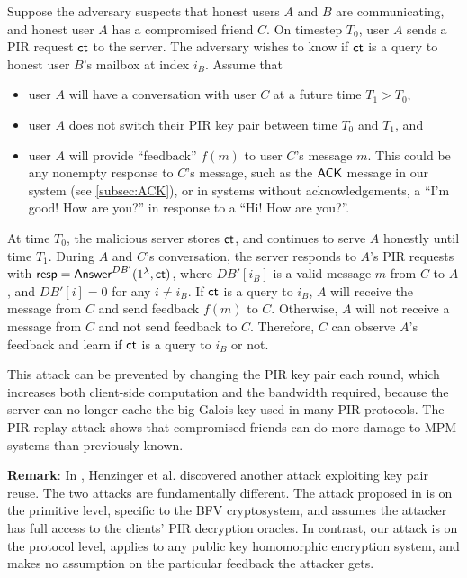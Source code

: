 Suppose the adversary suspects that honest users $A$ and $B$ are communicating, and honest user $A$ has a compromised friend $C$. On timestep $T_0$, user $A$ sends a PIR request $\mathsf{ct}$ to the server. The adversary wishes to know if $\mathsf{ct}$ is a query to honest user $B$'s mailbox at index $i_B$. Assume that
\begin{itemize}
    \item user $A$ will have a conversation with user $C$ at a future time $T_1 > T_0$,
    \item user $A$ does not switch their PIR key pair between time $T_0$ and $T_1$, and
    \item user $A$ will provide ``feedback'' $f(m)$ to user $C$'s message $m$. This could be any nonempty response to $C$'s message, such as the $\mathsf{ACK}$ message in our system (see \cref{subsec:ACK}), or in systems without acknowledgements, a ``I'm good! How are you?'' in response to a ``Hi! How are you?''.
\end{itemize}
At time $T_0$, the malicious server stores $\mathsf{ct}$, and continues to serve $A$ honestly until time $T_1$. During $A$ and $C$'s conversation, the server responds to $A$'s PIR requests with $\mathsf{resp} = \mathsf{Answer}^{DB'}(1^{\lambda}, \mathsf{ct})$, where $DB'[i_B]$ is a valid message $m$ from $C$ to $A$, and $DB'[i] = 0$ for any $i \neq i_B$. If $\mathsf{ct}$ is a query to $i_B$, $A$ will receive the message from $C$ and send feedback $f(m)$ to $C$. Otherwise, $A$ will not receive a message from $C$ and not send feedback to $C$. Therefore, $C$ can observe $A$'s feedback and learn if $\mathsf{ct}$ is a query to $i_B$ or not.

This attack can be prevented by changing the PIR key pair each round, which increases both client-side computation and the bandwidth required, because the server can no longer cache the big Galois key used in many PIR protocols. The PIR replay attack shows that compromised friends can do more damage to MPM systems than previously known.

\textbf{Remark}: In \cite{henry2022simplepir}, Henzinger et al. discovered another attack exploiting key pair reuse. The two attacks are fundamentally different. The attack proposed in \cite{henry2022simplepir} is on the primitive level, specific to the BFV cryptosystem, and assumes the attacker has full access to the clients' PIR decryption oracles. In contrast, our attack is on the protocol level, applies to any public key homomorphic encryption system, and makes no assumption on the particular feedback the attacker gets.

